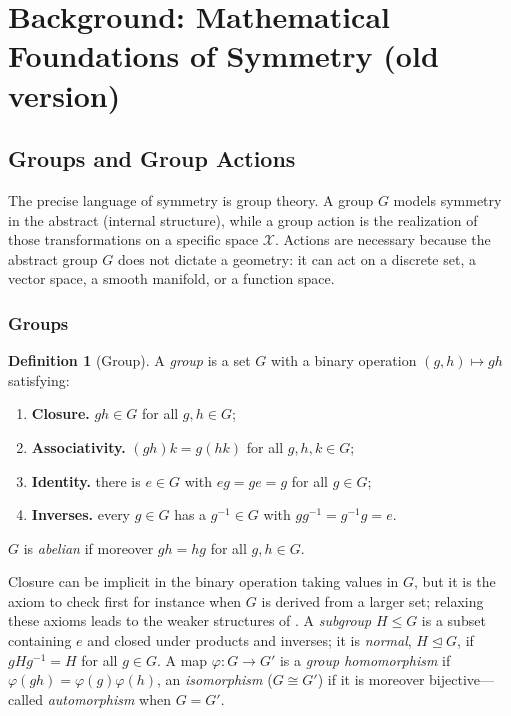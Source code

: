 \documentclass[11pt]{article}
\theoremstyle{plain}
\theoremstyle{definition}
\newtheorem{Definition}{Definition}[section]
\begin{document}
\section{Background: Mathematical Foundations of Symmetry (old version)}\label{sec:background}

\subsection{Groups and Group Actions}\label{sec:group-theory-backbone}

The precise language of symmetry is group theory.
A group $G$ models symmetry in the abstract (internal structure), while a group action is the realization of those transformations on a specific space $\mathcal X$.
Actions are necessary because the abstract group $G$ does not dictate a geometry: it can act on a discrete set, a vector space, a smooth manifold, or a function space.

\subsubsection{Groups}\label{subsec:groups}

\begin{Definition}[Group]\label{def:group}
A \emph{group} is a set $G$ with a binary operation $(g,h)\mapsto gh$ satisfying:
\begin{enumerate}[label=(G\arabic*), leftmargin=*, labelsep=0.5em]
    \item \textbf{Closure.} $gh \in G$ for all $g,h\in G$;
    \item \textbf{Associativity.} $(gh)k = g(hk)$ for all $g,h,k\in G$;
    \item \textbf{Identity.} there is $e\in G$ with $eg = ge = g$ for all $g\in G$;
    \item \textbf{Inverses.} every $g\in G$ has a $g^{-1}\in G$ with $gg^{-1} = g^{-1}g = e$.
\end{enumerate}
$G$ is \emph{abelian} if moreover $gh = hg$ for all $g,h\in G$.
\end{Definition}

Closure can be implicit in the binary operation taking values in $G$, but it is the axiom to check first for instance when $G$ is derived from a larger set; relaxing these axioms leads to the weaker structures of .
A \emph{subgroup} $H\leq G$ is a subset containing $e$ and closed under products and inverses; it is \emph{normal}, $H\trianglelefteq G$, if $gHg^{-1} = H$ for all $g\in G$.
A map $\varphi: G\to G'$ is a \emph{group homomorphism} if $\varphi(gh) = \varphi(g)\varphi(h)$, an \emph{isomorphism} ($G\cong G'$) if it is moreover bijective---called \emph{automorphism} when $G=G'$.
\end{document}
